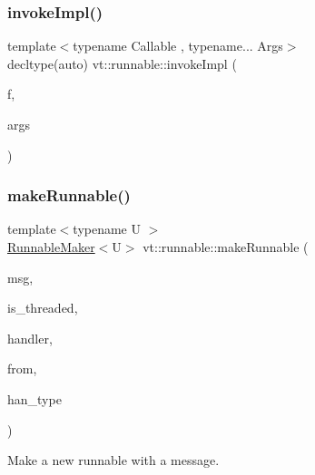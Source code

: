 \subsubsection{\texorpdfstring{invoke\+Impl()}{invokeImpl()}\hspace{0.1cm}{\footnotesize\ttfamily [2/2]}}
{\footnotesize\ttfamily template$<$typename Callable , typename... Args$>$ \\
decltype(auto) vt\+::runnable\+::invoke\+Impl (\begin{DoxyParamCaption}\item[{Callable \&\&}]{f,  }\item[{Args \&\&...}]{args }\end{DoxyParamCaption})}

\mbox{\label{namespacevt_1_1runnable_a58e12568ad654ac603758ecffb9bf0dd}} 
\subsubsection{\texorpdfstring{make\+Runnable()}{makeRunnable()}}
{\footnotesize\ttfamily template$<$typename U $>$ \\
\hyperlink{structvt_1_1runnable_1_1_runnable_maker}{Runnable\+Maker}$<$U$>$ vt\+::runnable\+::make\+Runnable (\begin{DoxyParamCaption}\item[{\hyperlink{namespacevt_ab2b3d506ec8e8d1540aede826d84a239}{Msg\+Shared\+Ptr}$<$ U $>$ const \&}]{msg,  }\item[{bool}]{is\+\_\+threaded,  }\item[{\hyperlink{namespacevt_af64846b57dfcaf104da3ef6967917573}{Handler\+Type}}]{handler,  }\item[{\hyperlink{namespacevt_a866da9d0efc19c0a1ce79e9e492f47e2}{Node\+Type}}]{from,  }\item[{\hyperlink{namespacevt_1_1auto__registry_a9f369ca2b484130b396729e2ddf05241}{auto\+\_\+registry\+::\+Registry\+Type\+Enum}}]{han\+\_\+type }\end{DoxyParamCaption})}



Make a new runnable with a message. 


